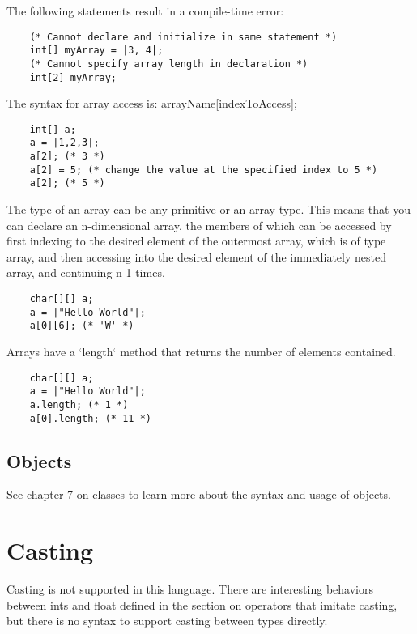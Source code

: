 \begin{homeworkProblem}
	The following statements result in a compile-time error:
	\begin{verbatim}
	(* Cannot declare and initialize in same statement *)
	int[] myArray = |3, 4|;
	(* Cannot specify array length in declaration *)
	int[2] myArray;
	\end{verbatim}

	The syntax for array access is: arrayName[indexToAccess];	
	\begin{verbatim}
	int[] a;
	a = |1,2,3|;
	a[2]; (* 3 *)
	a[2] = 5; (* change the value at the specified index to 5 *)
	a[2]; (* 5 *)
	\end{verbatim}

	The type of an array can be any primitive or an array type. This means that you can declare an n-dimensional array, the members of which can be accessed by first indexing to the desired element of the outermost array, which is of type array, and then accessing into the desired element of the immediately nested array, and continuing n-1 times.

	\begin{verbatim}
	char[][] a;
	a = |"Hello World"|;
	a[0][6]; (* 'W' *)
	\end{verbatim}
	
	Arrays have a `length` method that returns the number of elements contained.
	\begin{verbatim}
	char[][] a;
	a = |"Hello World"|;
	a.length; (* 1 *)
	a[0].length; (* 11 *)
	\end{verbatim}
	
	\subsection{Objects}
	
	See chapter 7 on classes to learn more about the syntax and usage of objects.

	\section{Casting}
	Casting is not supported in this language. There are interesting behaviors between ints and float defined in the section on operators that imitate casting, but there is no syntax to support casting between types directly. 

\end{homeworkProblem}
